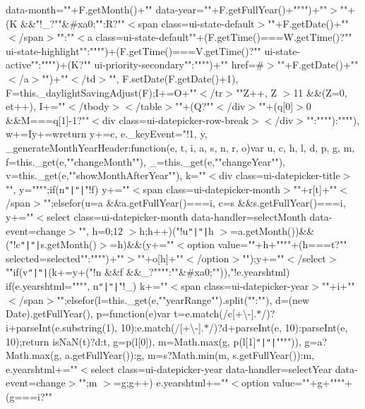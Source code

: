 data-\/month=\textquotesingle{}""+\+F.\+get\+Month()+""\textquotesingle{} data-\/year=\textquotesingle{}""+\+F.\+get\+Full\+Year()+""\textquotesingle{}"")+""$>$""+(\+K \&\&"!\+\_\+?""\&\#xa0;""\+:\+R?""$<$span class=\textquotesingle{}ui-\/state-\/default\textquotesingle{}$>$""+\+F.\+get\+Date()+""$<$/span$>$""\+:""$<$a class=\textquotesingle{}ui-\/state-\/default""+(\+F.\+get\+Time()===\+W.\+get\+Time()?"" ui-\/state-\/highlight""\+:"""")+(\+F.\+get\+Time()===\+V.\+get\+Time()?"" ui-\/state-\/active""\+:"""")+(\+K?"" ui-\/priority-\/secondary""\+:"""")+""\textquotesingle{} href=\textquotesingle{}\#\textquotesingle{}$>$""+\+F.\+get\+Date()+""$<$/a$>$"")+""$<$/td$>$"", F.\+set\+Date(\+F.\+get\+Date()+1), F=this.\+\_\+daylight\+Saving\+Adjust(\+F);\+I+=\+O+""$<$/tr$>$""\rcurly{}Z++, Z $>$11 \&\&(\+Z=0, et++), I+=""$<$/tbody$>$$<$/table$>$""+(\+Q?""$<$/div$>$""+(q[0]$>$0 \&\&\+M===q[1]-\/1?""$<$div class=\textquotesingle{}ui-\/datepicker-\/row-\/break\textquotesingle{}$>$$<$/div$>$""\+:"""")\+:""""), w+=I\rcurly{}y+=w\rcurly{}return y+=c, e.\+\_\+key\+Event="!1, y\rcurly{}, \+\_\+generate\+Month\+Year\+Header\+:function(e, t, i, a, s, n, r, o)\lcurly{}var u, c, h, l, d, p, g, m, f=this.\+\_\+get(e,""change\+Month""), \+\_\+=this.\+\_\+get(e,""change\+Year""), v=this.\+\_\+get(e,""show\+Month\+After\+Year""), k=""$<$div class=\textquotesingle{}ui-\/datepicker-\/title\textquotesingle{}$>$"", y="""";if(n\texttt{"|}\texttt{"|}"!f) y+=""$<$span class=\textquotesingle{}ui-\/datepicker-\/month\textquotesingle{}$>$""+r[t]+""$<$/span$>$"";else\lcurly{}for(u=a \&\&a.\+get\+Full\+Year()===i, c=s \&\&s.\+get\+Full\+Year()===i, y+=""$<$select class=\textquotesingle{}ui-\/datepicker-\/month\textquotesingle{} data-\/handler=\textquotesingle{}select\+Month\textquotesingle{} data-\/event=\textquotesingle{}change\textquotesingle{}$>$"", h=0;12 $>$h;h++)("!u\texttt{"|}\texttt{"|}h $>$=a.\+get\+Month())\&\&("!c\texttt{"|}\texttt{"|}s.\+get\+Month()$>$=h)\&\&(y+=""$<$option value=\textquotesingle{}""+h+""\textquotesingle{}""+(h===t?"" selected=\textquotesingle{}selected\textquotesingle{}""\+:"""")+""$>$""+o[h]+""$<$/option$>$"");y+=""$<$/select$>$""\rcurly{}if(v\texttt{"|}\texttt{"|}(k+=y+("!n \&\&f \&\&\+\_\+?""""\+:""\&\#xa0;"")),"!e.\+yearshtml) if(e.\+yearshtml="""", n\texttt{"|}\texttt{"|}"!\+\_\+) k+=""$<$span class=\textquotesingle{}ui-\/datepicker-\/year\textquotesingle{}$>$""+i+""$<$/span$>$"";else\lcurly{}for(l=this.\+\_\+get(e,""year\+Range"").\+split(""\+:""), d=(new Date).\+get\+Full\+Year(), p=function(e)\lcurly{}var t=e.\+match(/c[+\textbackslash{}-\/].$\ast$/)?i+parse\+Int(e.\+substring(1), 10)\+:e.\+match(/[+\textbackslash{}-\/].$\ast$/)?d+parse\+Int(e, 10)\+:parse\+Int(e, 10);return is\+Na\+N(t)?d\+:t\rcurly{}, g=p(l[0]), m=\+Math.\+max(g, p(l[1]\texttt{"|}\texttt{"|}"""")), g=a?\+Math.\+max(g, a.\+get\+Full\+Year())\+:g, m=s?\+Math.\+min(m, s.\+get\+Full\+Year())\+:m, e.\+yearshtml+=""$<$select class=\textquotesingle{}ui-\/datepicker-\/year\textquotesingle{} data-\/handler=\textquotesingle{}select\+Year\textquotesingle{} data-\/event=\textquotesingle{}change\textquotesingle{}$>$"";m $>$=g;g++) e.\+yearshtml+=""$<$option value=\textquotesingle{}""+g+""\textquotesingle{}""+(g===i?"" 